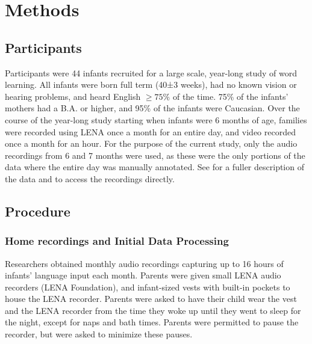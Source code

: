 \documentclass[man,floatsintext]{apa6}
\theoremstyle{definition}
\theoremstyle{definition}
\theoremstyle{definition}
\theoremstyle{remark}
\begin{document}
\hypertarget{methods}{%
\section{Methods}\label{methods}}

\hypertarget{participants}{%
\subsection{Participants}\label{participants}}

Participants were 44 infants recruited for a large scale, year-long
study of word learning. All infants were born full term (40±3 weeks),
had no known vision or hearing problems, and heard English \(\geq75\%\)
of the time. 75\% of the infants' mothers had a B.A. or higher, and 95\%
of the infants were Caucasian. Over the course of the year-long study
starting when infants were 6 months of age, families were recorded using
LENA once a month for an entire day, and video recorded once a month for
an hour. For the purpose of the current study, only the audio recordings
from 6 and 7 months were used, as these were the only portions of the
data where the entire day was manually annotated. See
\citet{Bergelson2018} for a fuller description of the data and
\citet{Bergelson} to access the recordings directly. \pagebreak

\hypertarget{procedure}{%
\subsection{Procedure}\label{procedure}}

\hypertarget{home-recordings-and-initial-data-processing}{%
\subsubsection{Home recordings and Initial Data
Processing}\label{home-recordings-and-initial-data-processing}}

Researchers obtained monthly audio recordings capturing up to 16 hours
of infants' language input each month. Parents were given small LENA
audio recorders (LENA Foundation), and infant-sized vests with built-in
pockets to house the LENA recorder. Parents were asked to have their
child wear the vest and the LENA recorder from the time they woke up
until they went to sleep for the night, except for naps and bath times.
Parents were permitted to pause the recorder, but were asked to minimize
these pauses.
\end{document}
